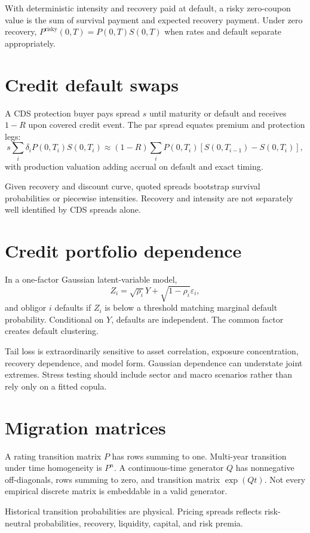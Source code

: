 With deterministic intensity and recovery paid at default, a risky zero-coupon value
is the sum of survival payment and expected recovery payment. Under zero recovery,
$P^{\mathrm{risky}}(0,T)=P(0,T)S(0,T)$ when rates and default separate appropriately.

\section{Credit default swaps}

A CDS protection buyer pays spread $s$ until maturity or default and receives
$1-R$ upon covered credit event. The par spread equates premium and protection legs:
\[
s\sum_i\delta_iP(0,T_i)S(0,T_i)
\approx
(1-R)\sum_iP(0,T_i)
[S(0,T_{i-1})-S(0,T_i)],
\]
with production valuation adding accrual on default and exact timing.

Given recovery and discount curve, quoted spreads bootstrap survival probabilities
or piecewise intensities. Recovery and intensity are not separately well identified
by CDS spreads alone.

\section{Credit portfolio dependence}

In a one-factor Gaussian latent-variable model,
\[
Z_i=\sqrt{\rho_i}Y+\sqrt{1-\rho_i}\varepsilon_i,
\]
and obligor $i$ defaults if $Z_i$ is below a threshold matching marginal default
probability. Conditional on $Y$, defaults are independent. The common factor creates
default clustering.

Tail loss is extraordinarily sensitive to asset correlation, exposure concentration,
recovery dependence, and model form. Gaussian dependence can understate joint
extremes. Stress testing should include sector and macro scenarios rather than rely
only on a fitted copula.

\section{Migration matrices}

A rating transition matrix $P$ has rows summing to one. Multi-year transition under
time homogeneity is $P^n$. A continuous-time generator $Q$ has nonnegative
off-diagonals, rows summing to zero, and transition matrix $\exp(Qt)$. Not every
empirical discrete matrix is embeddable in a valid generator.

Historical transition probabilities are physical. Pricing spreads reflects
risk-neutral probabilities, recovery, liquidity, capital, and risk premia.


